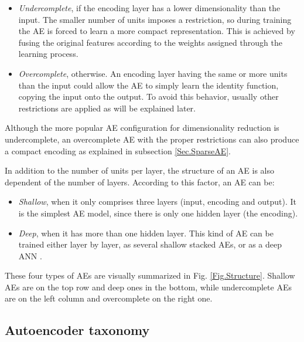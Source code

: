 \begin{itemize}
	\item \textit{Undercomplete}, if the encoding layer has a lower dimensionality than the input. The smaller number of units imposes a restriction, so during training the AE is forced to learn a more compact representation. This is achieved by fusing the original features according to the weights assigned through the learning process.
	
	\item \textit{Overcomplete}, otherwise. An encoding layer having the same or more units than the input could allow the AE to simply learn the identity function, copying the input onto the output. To avoid this behavior, usually other restrictions are applied as will be explained later.
\end{itemize}

Although the more popular AE configuration for dimensionality reduction is undercomplete, an overcomplete AE with the proper restrictions can also produce a compact encoding as explained in subsection \ref{Sec.SparseAE}.

In addition to the number of units per layer, the structure of an AE is also dependent of the number of layers. According to this factor, an AE can be:

\begin{itemize}
	\item \textit{Shallow}, when it only comprises three layers (input, encoding and output). It is the simplest AE model, since there is only one hidden layer (the encoding).
	
	\item \textit{Deep}, when it has more than one hidden layer. This kind of AE can be trained either layer by layer, as several shallow stacked AEs, or as a deep ANN \cite{DeepTrainingStrategies}.
\end{itemize}

These four types of AEs are visually summarized in Fig. \ref{Fig.Structure}. Shallow AEs are on the top row and deep ones in the bottom, while undercomplete AEs are on the left column and overcomplete on the right one.


\subsection{Autoencoder taxonomy}

